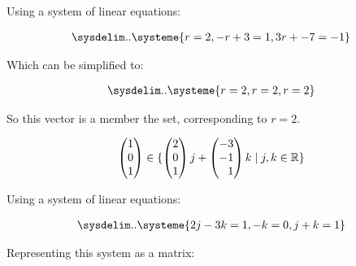 \documentclass[12pt]{article}
\newenvironment{abc}{\begin{enumerate}[label={\bf(\alph*)}]}{\end{enumerate}}
\newcommand\m[2][]{
	\ifthenelse{\equal {#1} {}}
		{\begin{pmatrix*}[r]#2\end{pmatrix*}}
		{\left(\begin{array}{#1}#2\end{array}\right)}
}
\begin{document}
\begin{abc}
\begin{item}
	Using a system of linear equations:

	\begin{equation}
	\begin{aligned}
		\sysdelim..\systeme{r = 2, -r + 3 = 1, 3r + -7 = -1}
	\end{aligned}
	\end{equation}


	Which can be simplified to:

	\begin{equation}
	\begin{aligned}
		\sysdelim..\systeme{r = 2, r = 2, r = 2}
	\end{aligned}
	\end{equation}

	So this vector is a member the set, corresponding to $r = 2$.
	\end{item}

	\begin{item}
	\begin{equation}
	\begin{aligned}
		\m{1 \\ 0 \\ 1} \in \{\m{2 \\ 0 \\ 1}j + \m{-3 \\ -1 \\ 1}k \mid j, k \in \mathbb{R} \}
	\end{aligned}
	\end{equation}

	Using a system of linear equations:

	\begin{equation}
	\begin{aligned}
		\sysdelim..\systeme{2j - 3k = 1, - k = 0, j + k = 1}
	\end{aligned}
	\end{equation}

	Representing this system as a matrix:


\end{item}
\end{abc}
\end{document}
